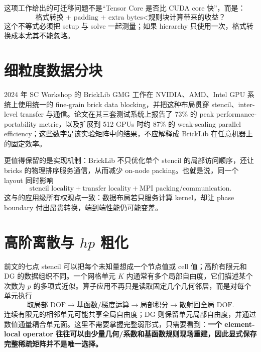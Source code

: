 这项工作给出的可迁移问题不是“Tensor Core 是否比 CUDA core 快”，而是：
\begin{equation}
\boxed{
\text{格式转换 + padding + extra bytes}
<
\text{规则块计算带来的收益？}
}
\end{equation}
这个不等式必须把 setup 与 solve 一起测量；如果 hierarchy 只使用一次，格式转换成本尤其不能忽略。

\section{细粒度数据分块}

2024 年 SC Workshop 的 BrickLib GMG 工作在 NVIDIA、AMD、Intel GPU 系统上使用统一的 fine-grain brick data blocking，并把这种布局贯穿 stencil、inter-level transfer 与通信\cite{antepara2024brick}。论文在其三套测试系统上报告了 73\% 的 peak performance-portability metric，以及扩展到 512 GPUs 时约 87\% 的 weak-scaling parallel efficiency；这些数字是该实验矩阵中的结果，不应解释成 BrickLib 在任意机器上的固定效率。

更值得保留的是实现机制：BrickLib 不只优化单个 stencil 的局部访问顺序，还让 bricks 的物理排序服务通信，从而减少 on-node packing。也就是说，同一个 layout 同时影响
\begin{equation}
\boxed{
\text{stencil locality}
+
\text{transfer locality}
+
\text{MPI packing/communication}.
}
\label{eq:modern-brick-layout}
\end{equation}
这与的应用级所有权观点一致：数据布局若只服务计算 kernel，却让 phase boundary 付出昂贵转换，端到端性能仍可能变差。

\section{高阶离散与 $hp$ 粗化}
\label{sec:modern-high-order-minimal-model}

前文的七点 stencil 可以把每个未知量想成一个节点值或 cell 值；高阶有限元和 DG 的数据组织不同。一个网格单元 $K$ 内通常有多个局部自由度，它们描述某个次数为 $p$ 的多项式近似。算子应用不再只是读取固定几个几何邻居，而是对每个单元执行
\begin{equation}
\boxed{\text{取局部 DOF}\rightarrow\text{基函数/梯度运算}\rightarrow\text{局部积分}\rightarrow\text{散射回全局 DOF}.}
\end{equation}
连续有限元的相邻单元可能共享全局自由度；DG 则保留单元局部自由度，并通过数值通量耦合单元面。这里不需要掌握完整弱形式，只需要看到：\textbf{一个 element-local operator 往往可以由少量几何/系数和基函数规则现场重建，因此显式保存完整稀疏矩阵并不是唯一选择。}

